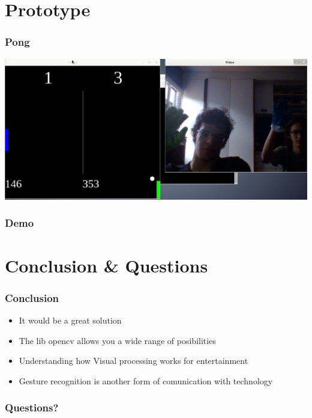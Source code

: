 \documentclass{beamer}
\begin{document}
\section{Prototype}
\begin{frame}
\frametitle{Pong}
\includegraphics[scale=0.24]{picpong.png}
\end{frame}
\begin{frame}
\frametitle{Demo}
\end{frame}
\section{Conclusion \& Questions}
\begin{frame}
 \frametitle{Conclusion}
\begin{itemize}
\item It would be a great solution 
\item The lib opencv allows you a wide range of posibilities
\item Understanding how Visual processing works for entertainment
\item Gesture recognition is another form of comunication with technology
 
\end{itemize}
\end{frame}
\begin{frame}
 \frametitle{Questions?}
\end{frame}
\end{document}
